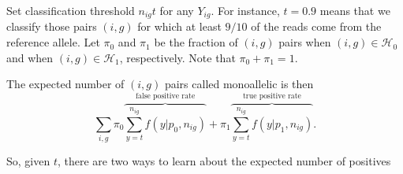 \documentclass[letterpaper]{article}
\begin{document}
Set classification threshold \(n_{ig} t\) for any \(Y_{ig}\).  For instance,
\(t=0.9\) means that we classify those pairs \((i,g)\) for which at least
\(9/10\) of the reads come from the reference allele.  Let
\(\pi_0\) and \(\pi_1\) be the fraction of \((i,g)\) pairs when
\((i,g)\in\mathcal{H}_0\) and when
\((i,g)\in\mathcal{H}_1\), respectively.  Note that \(\pi_0+\pi_1=1\).

The expected number of \((i,g)\) pairs called monoallelic is then
\begin{equation}
\sum_{i,g} \pi_0 \overbrace{ \sum_{y=t}^{n_{ig}} f(y|p_0,n_{ig})}^{\text{false
positive rate}} + \pi_1
\overbrace{ \sum_{y=t}^{n_{ig}} f(y|p_1,n_{ig})}^{\text{true positive rate}}.
\end{equation}

So, given \(t\), there are two ways to learn about the expected number of positives
\end{document}
